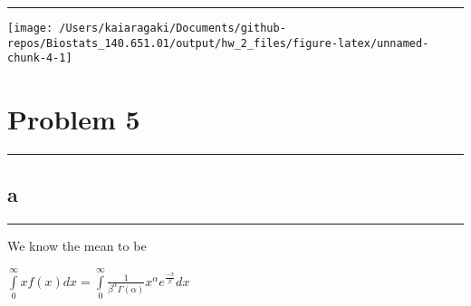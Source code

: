 \documentclass[]{tufte-handout}
\newenvironment{Shaded}{}{}
\newcommand{\DataTypeTok}[1]{\textcolor[rgb]{0.56,0.13,0.00}{#1}}
\newcommand{\DecValTok}[1]{\textcolor[rgb]{0.25,0.63,0.44}{#1}}
\newcommand{\FloatTok}[1]{\textcolor[rgb]{0.25,0.63,0.44}{#1}}
\newcommand{\KeywordTok}[1]{\textcolor[rgb]{0.00,0.44,0.13}{\textbf{#1}}}
\newcommand{\NormalTok}[1]{#1}
\newcommand{\OperatorTok}[1]{\textcolor[rgb]{0.40,0.40,0.40}{#1}}
\newcommand{\StringTok}[1]{\textcolor[rgb]{0.25,0.44,0.63}{#1}}
\begin{document}
\begin{center}\rule{0.5\linewidth}{0.5pt}\end{center}

\begin{Shaded}
\end{Shaded}

\texttt{[image: /Users/kaiaragaki/Documents/github-repos/Biostats\_140.651.01/output/hw\_2\_files/figure-latex/unnamed-chunk-4-1]}

\hypertarget{problem-5}{%
\section{Problem 5}\label{problem-5}}

\begin{center}\rule{0.5\linewidth}{0.5pt}\end{center}

\hypertarget{a-3}{%
\subsection{a}\label{a-3}}

\begin{center}\rule{0.5\linewidth}{0.5pt}\end{center}

We know the mean to be

\(\int\limits_0^\infty xf(x)dx = \int\limits_0^\infty \frac{1}{\beta^\alpha\Gamma(\alpha)}x^\alpha e^{\frac{-x}{\beta}}dx\)
\end{document}
